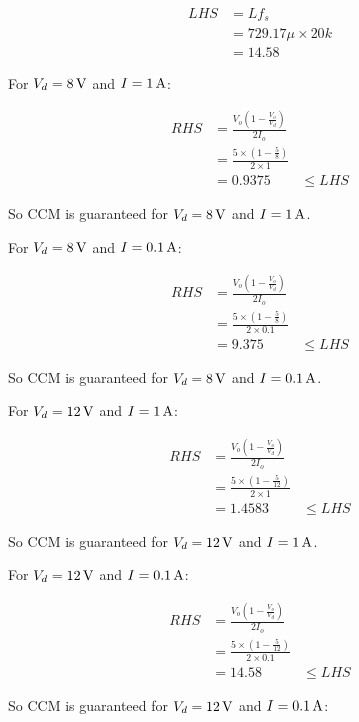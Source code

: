 \begin{align*}
LHS  & = Lf_s \\
     & = 729.17 \mu \times 20k \\
     & = 14.58
\end{align*}

For $V_d=\unit[8]{V}$ and $I=\unit[1]{A}$:

\begin{align*} 
RHS   & = \frac{V_o \left( 1 - \frac{V_o}{V_d}\right)}{2 I_o} \\
      & = \frac{5 \times \left( 1 - \frac{5}{8}\right)}{2 \times 1} \\
      & = 0.9375
      & \leq LHS
\end{align*}

So CCM is guaranteed for $V_d=\unit[8]{V}$ and $I=\unit[1]{A}$.


For $V_d=\unit[8]{V}$ and $I=\unit[0.1]{A}$:

\begin{align*} 
RHS   & = \frac{V_o \left( 1 - \frac{V_o}{V_d}\right)}{2 I_o} \\
      & = \frac{5 \times \left( 1 - \frac{5}{8}\right)}{2 \times 0.1} \\
      & = 9.375
      & \leq LHS
\end{align*}

So CCM is guaranteed for $V_d=\unit[8]{V}$ and $I=\unit[0.1]{A}$.


For $V_d=\unit[12]{V}$ and $I=\unit[1]{A}$:

\begin{align*} 
RHS   & = \frac{V_o \left( 1 - \frac{V_o}{V_d}\right)}{2 I_o} \\
      & = \frac{5 \times \left( 1 - \frac{5}{12}\right)}{2 \times 1} \\
      & = 1.4583
      & \leq LHS
\end{align*}

So CCM is guaranteed for $V_d=\unit[12]{V}$ and $I=\unit[1]{A}$.


For $V_d=\unit[12]{V}$ and $I=\unit[0.1]{A}$:

\begin{align*} 
RHS   & = \frac{V_o \left( 1 - \frac{V_o}{V_d}\right)}{2 I_o} \\
      & = \frac{5 \times \left( 1 - \frac{5}{12}\right)}{2 \times 0.1} \\
      & = 14.58
      & \leq LHS
\end{align*}

So CCM is guaranteed for $V_d=\unit[12]{V}$ and $I=\unit[0.1]{A}$:

